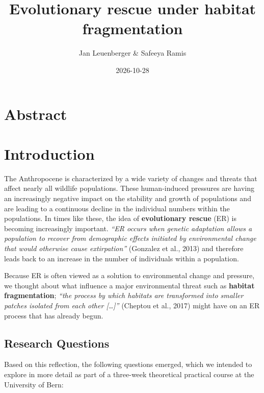 \documentclass[
]{article}
\title{Evolutionary rescue under habitat fragmentation}
\author{Jan Leuenberger \& Safeeya Ramis}
\date{2026-10-28}
\begin{document}
\maketitle

\section*{Abstract}\label{abstract}

\section{Introduction}\label{introduction}

The Anthropocene is characterized by a wide variety of changes and
threats that affect nearly all wildlife populations. These human-induced
pressures are having an increasingly negative impact on the stability
and growth of populations and are leading to a continuous decline in the
individual numbers within the populations. In times like these, the idea
of \textbf{evolutionary rescue} (ER) is becoming increasingly important.
\emph{``ER occurs when genetic adaptation allows a population to recover
from demographic effects initiated by environmental change that would
otherwise cause extirpation''} (Gonzalez et al., 2013) and therefore
leads back to an increase in the number of individuals within a
population.

Because ER is often viewed as a solution to environmental change and
pressure, we thought about what influence a major environmental threat
such as \textbf{habitat fragmentation}; \emph{``the process by which
habitats are transformed into smaller patches isolated from each other
{[}\ldots{]}''} (Cheptou et al., 2017) might have on an ER process that
has already begun.

\subsection{Research Questions}\label{research-questions}

Based on this reflection, the following questions emerged, which we
intended to explore in more detail as part of a three-week theoretical
practical course at the University of Bern:
\end{document}
